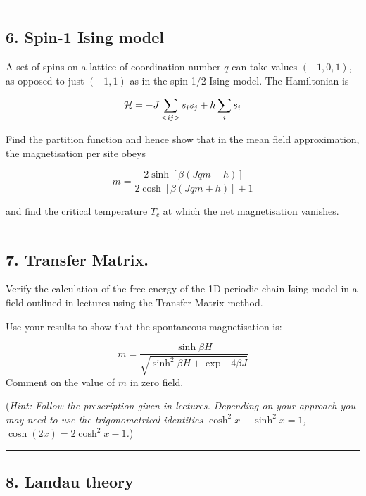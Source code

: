 \documentclass[
  letterpaper,
  enabledeprecatedfontcommands]{report}
\begin{document}
\begin{center}\rule{0.5\linewidth}{0.5pt}\end{center}

\subsection*{6. Spin-1 Ising model}\label{spin-1-ising-model}

A set of spins on a lattice of coordination number \(q\) can take values
\((-1,0,1)\), as opposed to just \((-1,1)\) as in the spin-1/2 Ising
model. The Hamiltonian is

\[{\cal H}=-J\sum_{<ij>}s_is_j + h\sum_i s_i\]

Find the partition function and hence show that in the mean field
approximation, the magnetisation per site obeys

\[m=\frac{2\sinh[\beta(Jqm+h)]}{2\cosh[\beta(Jqm+h)]+1}\]

and find the critical temperature \(T_c\) at which the net magnetisation
vanishes.

\begin{center}\rule{0.5\linewidth}{0.5pt}\end{center}

\subsection*{7. Transfer Matrix.}\label{transfer-matrix.}

Verify the calculation of the free energy of the 1D periodic chain Ising
model in a field outlined in lectures using the Transfer Matrix method.

Use your results to show that the spontaneous magnetisation is:

\[m=\frac{\sinh \beta H}{\sqrt{\sinh^2\beta H+\exp{-4\beta J}}}\]
Comment on the value of \(m\) in zero field.

(\emph{Hint: Follow the prescription given in lectures. Depending on
your approach you may need to use the trigonometrical identities
\(\cosh^2x-\sinh^2x=1\), \(\cosh(2x)=2\cosh^2x-1\).})

\begin{center}\rule{0.5\linewidth}{0.5pt}\end{center}

\subsection*{8. Landau theory}\label{landau-theory}
\end{document}
